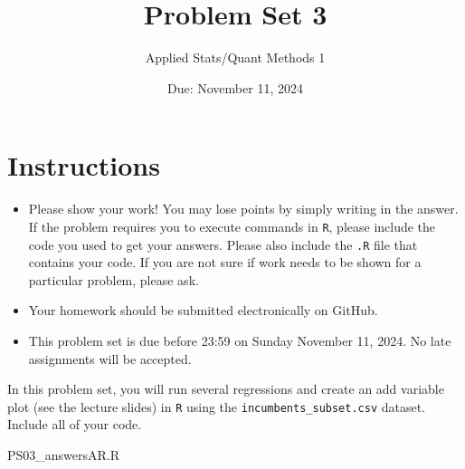 \documentclass[12pt,letterpaper]{article}
\title{Problem Set 3}
\date{Due: November 11, 2024}
\author{Applied Stats/Quant Methods 1}
\begin{document}
	\maketitle
	\section*{Instructions}
	\begin{itemize}
		\item Please show your work! You may lose points by simply writing in the answer. If the problem requires you to execute commands in \texttt{R}, please include the code you used to get your answers. Please also include the \texttt{.R} file that contains your code. If you are not sure if work needs to be shown for a particular problem, please ask.
	\item Your homework should be submitted electronically on GitHub.
	\item This problem set is due before 23:59 on Sunday November 11, 2024. No late assignments will be accepted.

	\end{itemize}

		\vspace{.25cm}
	
\noindent In this problem set, you will run several regressions and create an add variable plot (see the lecture slides) in \texttt{R} using the \texttt{incumbents\_subset.csv} dataset. Include all of your code.

	\vspace{.5cm}
		 {PS03_answersAR.R}
\end{document}
